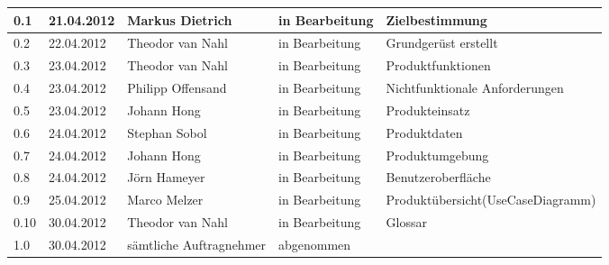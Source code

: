 \begin{longtable}{|m{1.78cm}|m{1.59cm}|m{2.86cm}|m{1.9cm}|m{5.25cm}|}
  0.1   &   21.04.2012     &   Markus Dietrich       &   in Bearbeitung    &  Zielbestimmung    \\       %
  \hline                                              %
  0.2   &   22.04.2012     &   Theodor van Nahl   &   in Bearbeitung    &  Grundgerüst erstellt   \\       %
  \hline                                              %
  0.3   &   23.04.2012     &   Theodor van Nahl   &   in Bearbeitung    &  Produktfunktionen   \\       %
  \hline                                              %
  0.4   &   23.04.2012     &   Philipp Offensand   &   in Bearbeitung    &  Nichtfunktionale Anforderungen   \\       %
  \hline                                              %
  0.5   &   23.04.2012     &   Johann Hong           &   in Bearbeitung    &  Produkteinsatz   \\       %
  \hline                                              %
  0.6   &   24.04.2012     &   Stephan Sobol         &   in Bearbeitung    &  Produktdaten  \\       %
  \hline                                              %
  0.7   &   24.04.2012     &   Johann Hong           &   in Bearbeitung    &  Produktumgebung   \\       %
  \hline                                              %
  0.8   &   24.04.2012     &   Jörn Hameyer          &   in Bearbeitung    &  Benutzeroberfläche   \\       %
  \hline                                              %
  0.9   &   25.04.2012     &   Marco Melzer           &   in Bearbeitung    &  Produktübersicht(UseCaseDiagramm)   \\       %
  \hline                                              %
  0.10 &   30.04.2012     &   Theodor van Nahl   &   in Bearbeitung    &  Glossar   \\       %
  \hline                                              %
  1.0   &   30.04.2012     &   sämtliche Auftragnehmer   &   abgenommen    &     \\       %
  \hline                                              %
\end{longtable}


